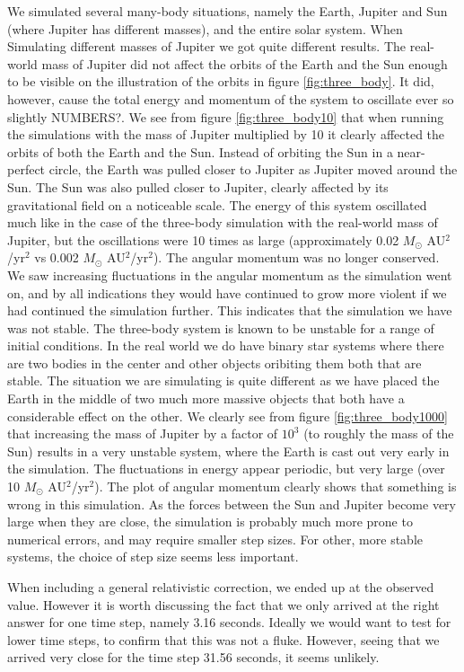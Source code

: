 \documentclass[reprint, english,notitlepage,nofootinbib]{revtex4-1}  %
\begin{document}
We simulated several many-body situations, namely the Earth, Jupiter and Sun (where Jupiter has different masses), and the entire solar system. When Simulating different masses of Jupiter we got quite different results. The real-world mass of Jupiter did not affect the orbits of the Earth and the Sun enough to be visible on the illustration of the orbits in figure \ref{fig:three_body}. It did, however, cause the total energy and momentum of the system to oscillate ever so slightly NUMBERS?. We see from figure \ref{fig:three_body10} that when running the simulations with the mass of Jupiter multiplied by 10 it clearly affected the orbits of both the Earth and the Sun. Instead of orbiting the Sun in a near-perfect circle, the Earth was pulled closer to Jupiter as Jupiter moved around the Sun. The Sun was also pulled closer to Jupiter, clearly affected by its gravitational field on a noticeable scale. The energy of this system oscillated much like in the case of the three-body simulation with the real-world mass of Jupiter, but the oscillations were 10 times as large (approximately 0.02 $M_\odot$ AU$^2$/yr$^2$ vs 0.002 $M_\odot$ AU$^2$/yr$^2$). The angular momentum was no longer conserved. We saw increasing fluctuations in the angular momentum as the simulation went on, and by all indications they would have continued to grow more violent if we had continued the simulation further. This indicates that the simulation we have was not stable. The three-body system is known to be unstable for a range of initial conditions. In the real world we do have binary star systems where there are two bodies in the center and other objects oribiting them both that are stable. The situation we are simulating is quite different as we have placed the Earth in the middle of two much more massive objects that both have a considerable effect on the other. We clearly see from figure \ref{fig:three_body1000} that increasing the mass of Jupiter by a factor of $10^3$ (to roughly the mass of the Sun) results in a very unstable system, where the Earth is cast out very early in the simulation. The fluctuations in energy appear periodic, but very large (over 10 $M_\odot$ AU$^2$/yr$^2$). The plot of angular momentum clearly shows that something is wrong in this simulation. As the forces between the Sun and Jupiter become very large when they are close, the simulation is probably much more prone to numerical errors, and may require smaller step sizes. For other, more stable systems, the choice of step size seems less important.

When including a general relativistic correction, we ended up at the observed value. However it is worth discussing the fact that we only arrived at the right answer for one time step, namely 3.16 seconds. Ideally we would want to test for lower time steps, to confirm that this was not a fluke. However, seeing that we arrived very close for the time step 31.56 seconds, it seems unlikely.
\end{document}
